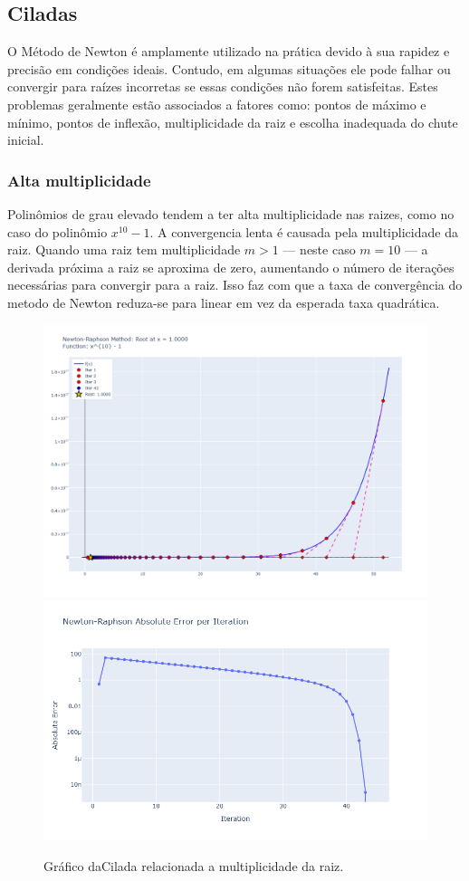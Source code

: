 \subsection{Ciladas}
O Método de Newton é amplamente utilizado na prática devido à sua rapidez e precisão em condições ideais. Contudo, em algumas situações ele pode falhar ou convergir para raízes incorretas se essas condições não forem satisfeitas. Estes problemas geralmente estão associados a fatores como: pontos de máximo e mínimo, pontos de inflexão, multiplicidade da raiz e escolha inadequada do chute inicial.

\subsubsection{Alta multiplicidade}
Polinômios de grau elevado tendem a ter alta multiplicidade nas raizes, como no caso do polinômio $x^{10} - 1$.
A convergencia lenta é causada pela multiplicidade da raiz. Quando uma raiz tem multiplicidade $m > 1$ — neste caso $m = 10$ — a derivada próxima a raiz se aproxima de zero, aumentando o número de iterações necessárias para convergir para a raiz.
Isso faz com que a taxa de convergência do metodo de Newton reduza-se para linear em vez da esperada taxa quadrática.
\begin{figure}[H]
    \centering 
    \includegraphics[width=1\textwidth]{Imagens/pitfalls/01/x_10-1.png}
    \includegraphics[width=1\textwidth]{Imagens/pitfalls/01/err_x_10-1.png}
    \caption{Gráfico daCilada relacionada a multiplicidade da raiz.}
    \label{fig:ciladaMultRaiz}
\end{figure}

